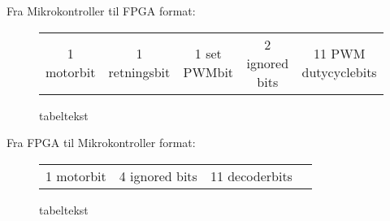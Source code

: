 
  
Fra Mikrokontroller til FPGA format:
\begin{figure}[th!]
\centering
\begin{tabular}{c|c|c|c|c}
1 motorbit &1 retningsbit & 1 set PWMbit & 2 ignored bits & 11 PWM dutycyclebits
\end{tabular}
\captionsetup{type=figure}
\caption[tekst i indholdsfortegnelsen]{tabeltekst}
\label{tb:}
\end{figure}

   
  
  Fra FPGA til Mikrokontroller format:
 \begin{figure}[th!]
 \centering
 \begin{tabular}{c|c|c|c}
 1 motorbit & 4 ignored bits & 11 decoderbits
  
 \end{tabular}
 \captionsetup{type=figure}
 \caption[tekst i indholdsfortegnelsen]{tabeltekst}
 \label{tb:}
 \end{figure}
